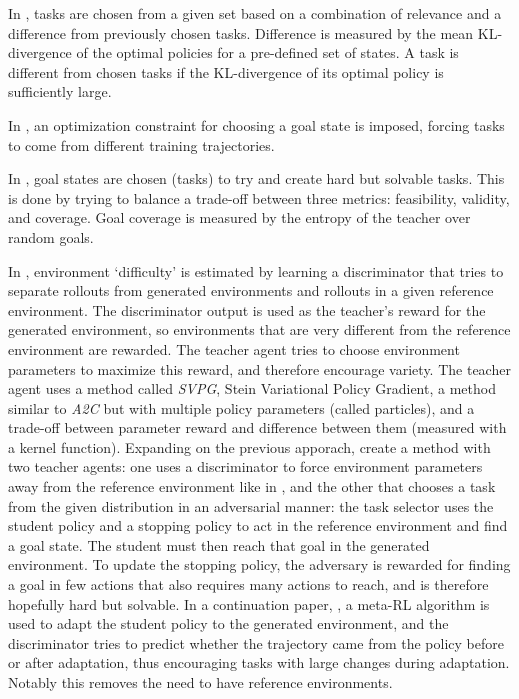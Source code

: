 \documentclass[letterpaper]{article}
\theoremstyle{definition}
\begin{document}
In \cite{Gutierrez2020}, tasks are chosen from a given set based on a combination of relevance and a difference from previously chosen tasks. Difference is measured by the mean KL-divergence of the optimal policies for a pre-defined set of states. A task is different from chosen tasks if the KL-divergence of its optimal policy is sufficiently large.

In \cite{Reny2019}, an optimization constraint for choosing a goal state is imposed, forcing tasks to come from different training trajectories.

In \cite{Racaniere2019}, goal states are chosen (tasks) to try and create hard but solvable tasks. 
This is done by trying to balance a trade-off between three metrics: feasibility, validity, and coverage.
Goal coverage is measured by the entropy of the teacher over random goals.

In \cite{Mehta2019}, environment `difficulty' is estimated by learning a discriminator that tries to separate rollouts from generated environments and rollouts in a given reference environment. The discriminator output is used as the teacher's reward for the generated environment, so environments that are very different from the reference environment are rewarded. 
The teacher agent tries to choose environment parameters to maximize this reward, and therefore encourage variety. The teacher agent uses a method called \textit{SVPG}, Stein Variational Policy Gradient, a method similar to \textit{A2C} but with multiple policy parameters (called particles), and a trade-off between parameter reward and difference between them (measured with a kernel function).
Expanding on the previous apporach, \cite{Raparthy2020} create a method with two teacher agents: one uses a discriminator to force environment parameters away from the reference environment like in \cite{Mehta2019}, and the other that chooses a task from the given distribution in an adversarial manner: the task selector uses the student policy and a stopping policy to act in the reference environment and find a goal state. The student must then reach that goal in the generated environment. To update the stopping policy, the adversary is rewarded for finding a goal in few actions that also requires many actions to reach, and is therefore hopefully hard but solvable. 
In a continuation paper, \cite{Mehta2020}, a meta-RL algorithm is used to adapt the student policy to the generated environment, and the discriminator tries to predict whether the trajectory came from the policy before or after adaptation, thus encouraging tasks with large changes during adaptation. Notably this removes the need to have reference environments.
\end{document}
